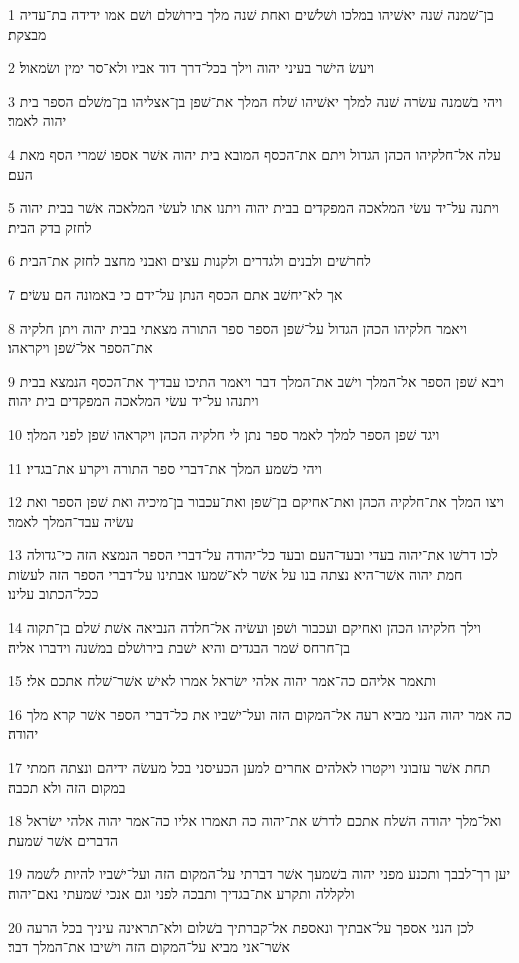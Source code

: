 \par 1 בן־שׁמנה שׁנה יאשׁיהו במלכו ושׁלשׁים ואחת שׁנה מלך בירושׁלם ושׁם אמו ידידה בת־עדיה מבצקת׃
\par 2 ויעשׂ הישׁר בעיני יהוה וילך בכל־דרך דוד אביו ולא־סר ימין ושׂמאול׃
\par 3 ויהי בשׁמנה עשׂרה שׁנה למלך יאשׁיהו שׁלח המלך את־שׁפן בן־אצליהו בן־משׁלם הספר בית יהוה לאמר׃
\par 4 עלה אל־חלקיהו הכהן הגדול ויתם את־הכסף המובא בית יהוה אשׁר אספו שׁמרי הסף מאת העם׃
\par 5 ויתנה על־יד עשׂי המלאכה המפקדים בבית יהוה ויתנו אתו לעשׂי המלאכה אשׁר בבית יהוה לחזק בדק הבית׃
\par 6 לחרשׁים ולבנים ולגדרים ולקנות עצים ואבני מחצב לחזק את־הבית׃
\par 7 אך לא־יחשׁב אתם הכסף הנתן על־ידם כי באמונה הם עשׂים׃
\par 8 ויאמר חלקיהו הכהן הגדול על־שׁפן הספר ספר התורה מצאתי בבית יהוה ויתן חלקיה את־הספר אל־שׁפן ויקראהו׃
\par 9 ויבא שׁפן הספר אל־המלך וישׁב את־המלך דבר ויאמר התיכו עבדיך את־הכסף הנמצא בבית ויתנהו על־יד עשׂי המלאכה המפקדים בית יהוה׃
\par 10 ויגד שׁפן הספר למלך לאמר ספר נתן לי חלקיה הכהן ויקראהו שׁפן לפני המלך׃
\par 11 ויהי כשׁמע המלך את־דברי ספר התורה ויקרע את־בגדיו׃
\par 12 ויצו המלך את־חלקיה הכהן ואת־אחיקם בן־שׁפן ואת־עכבור בן־מיכיה ואת שׁפן הספר ואת עשׂיה עבד־המלך לאמר׃
\par 13 לכו דרשׁו את־יהוה בעדי ובעד־העם ובעד כל־יהודה על־דברי הספר הנמצא הזה כי־גדולה חמת יהוה אשׁר־היא נצתה בנו על אשׁר לא־שׁמעו אבתינו על־דברי הספר הזה לעשׂות ככל־הכתוב עלינו׃
\par 14 וילך חלקיהו הכהן ואחיקם ועכבור ושׁפן ועשׂיה אל־חלדה הנביאה אשׁת שׁלם בן־תקוה בן־חרחס שׁמר הבגדים והיא ישׁבת בירושׁלם במשׁנה וידברו אליה׃
\par 15 ותאמר אליהם כה־אמר יהוה אלהי ישׂראל אמרו לאישׁ אשׁר־שׁלח אתכם אלי׃
\par 16 כה אמר יהוה הנני מביא רעה אל־המקום הזה ועל־ישׁביו את כל־דברי הספר אשׁר קרא מלך יהודה׃
\par 17 תחת אשׁר עזבוני ויקטרו לאלהים אחרים למען הכעיסני בכל מעשׂה ידיהם ונצתה חמתי במקום הזה ולא תכבה׃
\par 18 ואל־מלך יהודה השׁלח אתכם לדרשׁ את־יהוה כה תאמרו אליו כה־אמר יהוה אלהי ישׂראל הדברים אשׁר שׁמעת׃
\par 19 יען רך־לבבך ותכנע מפני יהוה בשׁמעך אשׁר דברתי על־המקום הזה ועל־ישׁביו להיות לשׁמה ולקללה ותקרע את־בגדיך ותבכה לפני וגם אנכי שׁמעתי נאם־יהוה׃
\par 20 לכן הנני אספך על־אבתיך ונאספת אל־קברתיך בשׁלום ולא־תראינה עיניך בכל הרעה אשׁר־אני מביא על־המקום הזה וישׁיבו את־המלך דבר׃

